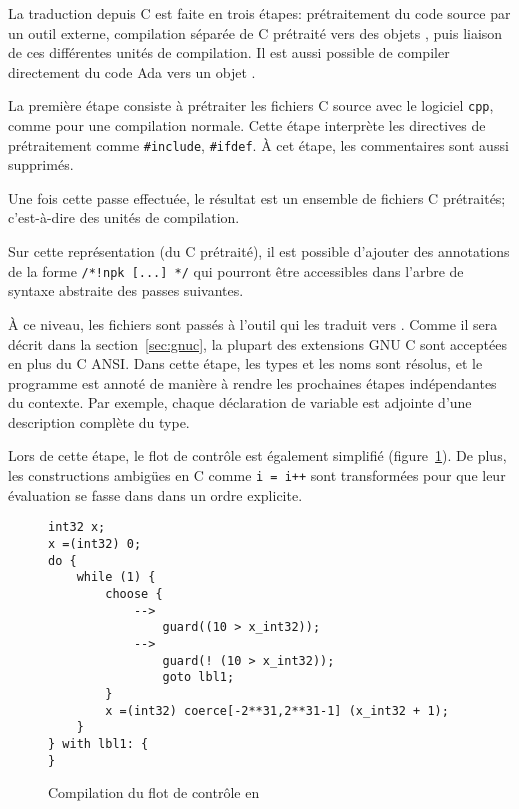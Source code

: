 La traduction depuis C est faite en trois étapes: prétraitement du code source
par un outil externe, compilation séparée de C prétraité vers des objets
\newspeak{}, puis liaison de ces différentes unités de compilation. Il est aussi
possible de compiler directement du code Ada vers un objet \newspeak{}.

La première étape consiste à prétraiter les fichiers C source avec le logiciel
\texttt{cpp}, comme pour une compilation normale. Cette étape interprète les
directives de prétraitement comme \texttt{\#include}, \texttt{\#ifdef}. À cet
étape, les commentaires sont aussi supprimés.

Une fois cette passe effectuée, le résultat est un ensemble de fichiers C
prétraités; c'est-à-dire des unités de compilation.

Sur cette représentation (du C prétraité), il est possible d'ajouter des
annotations de la forme \texttt{/*!npk [...] */} qui pourront être accessibles
dans l'arbre de syntaxe abstraite des passes suivantes.

À ce niveau, les fichiers sont passés à l'outil \ctonewspeak qui les
traduit vers \newspeak. Comme il sera décrit dans la section~\ref{sec:gnuc}, la
plupart des extensions GNU C sont acceptées en plus du C ANSI. Dans cette étape,
les types et les noms sont résolus, et le programme est annoté de manière à
rendre les prochaines étapes indépendantes du contexte. Par exemple, chaque
déclaration de variable est adjointe d'une description complète du type.

Lors de cette étape, le flot de contrôle est également simplifié
(figure~\ref{fig:flot-controle-simple}). De plus, les constructions ambigües en
C comme \texttt{i = i++} sont transformées pour que leur évaluation se fasse
dans dans un ordre explicite.

\begin{figure}[b]

\begin{minipage}{0.25\linewidth}
\end{minipage}
\begin{minipage}{0.7\linewidth}
\begin{Verbatim}
int32 x;
x =(int32) 0;
do {
    while (1) {
        choose {
            -->
                guard((10 > x_int32));
            -->
                guard(! (10 > x_int32));
                goto lbl1;
        }
        x =(int32) coerce[-2**31,2**31-1] (x_int32 + 1);
    }
} with lbl1: {
}
\end{Verbatim}
\end{minipage}

    \caption{Compilation du flot de contrôle en \newspeak}
    \label{fig:flot-controle-simple}
\end{figure}

